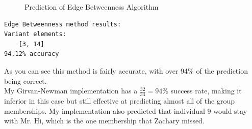 \begin{figure}[h!]
\centering
{}
\caption{Prediction of Edge Betweenness Algorithm}
\label{fig:graph_eb}
\end{figure}

\begin{verbatim}
Edge Betweenness method results: 
Variant elements:
	[3, 14]
94.12% accuracy
\end{verbatim}

As you can see this method is fairly accurate, with over 94\% of the prediction being correct.
\\
My Girvan-Newman implementation has a $\frac{32}{34} = 94\%$ success rate, making it inferior in this case 
but still effective at predicting almost all of the group memberships. My implementation also predicted that individual $9$ would stay with Mr. Hi, which is the one membership that Zachary missed.

\clearpage

